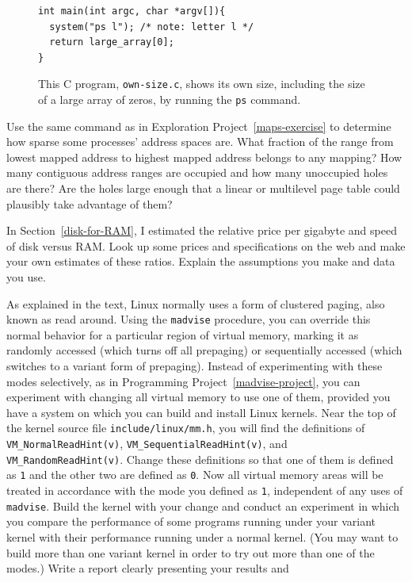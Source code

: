 \begin{chapterEnumerate}
\begin{figure}
\begin{verbatim}
int main(int argc, char *argv[]){
  system("ps l"); /* note: letter l */
  return large_array[0];
}
\end{verbatim}
\caption{This C program, {\tt own-size.c}, shows its own size, including the size of a
  large array of zeros, by running the {\tt ps} command.}
\label{own-size-program}
\end{figure}
\item
Use the same command as in Exploration Project~\ref{maps-exercise} to determine
how sparse some processes' address spaces are.  What fraction of the
range from lowest mapped address to highest mapped address belongs to
any mapping?  How many contiguous address ranges are occupied and how
many unoccupied holes are there?  Are the holes large enough that a
linear or multilevel page table could plausibly take advantage of
them?
\item
In Section~\ref{disk-for-RAM}, I estimated the relative price per
gigabyte and speed of disk versus RAM.  Look up some prices and
specifications on the web and make your own estimates of these
ratios.  Explain the assumptions you make and data you use.
\item
As explained in the text, Linux normally uses a form of clustered
paging, also known as read around.  Using the
\verb|madvise|
procedure, you can override this normal behavior for a particular region of
virtual memory, marking it as randomly accessed (which turns off all
prepaging) or sequentially accessed (which switches to a variant form
of prepaging).  Instead of experimenting with these modes selectively,
as in Programming Project~\ref{madvise-project}, you can experiment
with changing all virtual memory to use one of them, provided you have a system on which you can build and
install Linux kernels.  Near the top of the kernel source file
\verb|include/linux/mm.h|, you will find the definitions of
\verb|VM_NormalReadHint(v)|, \verb|VM_SequentialReadHint(v)|, and
\verb|VM_RandomReadHint(v)|.  Change these definitions so that one of
them is defined as \verb|1| and the other two are defined as
\verb|0|.  Now all virtual memory areas will be treated in accordance
with the mode you defined as \verb|1|, independent of any uses of
\verb|madvise|.  Build the kernel with your change and conduct an
experiment in which you compare the performance of some
programs running under your variant kernel with their performance
running under a normal kernel.  (You may want to build more than one
variant kernel in order to try out more than one of the modes.)
Write a report clearly presenting your results and

\end{chapterEnumerate}
